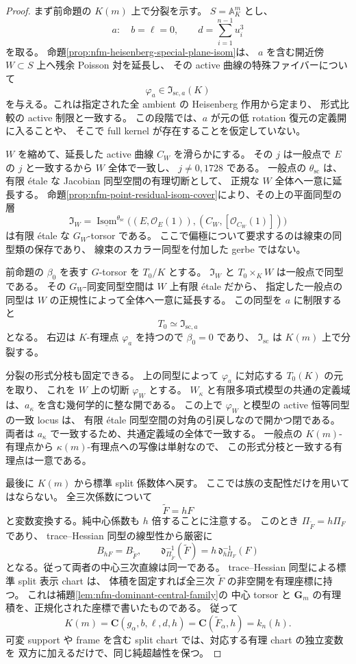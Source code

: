 \begin{proof}
まず前命題の $K(m)$ 上で分裂を示す。
$S=\mathbb A_K^m$ とし、
\[
 a:\quad b=\ell=0,\qquad d=\sum_{i=1}^{n-1}u_i^3
\]
を取る。
命題\ref{prop:nfm-heisenberg-special-plane-isom}は、
$a$ を含む開近傍 $W\subset S$ 上へ残余 Poisson 対を延長し、
その active 曲線の特殊ファイバーについて
\[
 \varphi_a\in\mathfrak I_{\mathrm{sc},a}(K)
\]
を与える。これは指定された全 ambient の Heisenberg 作用から定まり、
形式比較の active 制限と一致する。
この段階では、$a$ が元の低 rotation 復元の定義開に入ることや、
そこで full kernel が存在することを仮定していない。

$W$ を縮めて、延長した active 曲線 $C_W$ を滑らかにする。
その $j$ は一般点で $E$ の $j$ と一致するから $W$ 全体で一致し、
$j\ne0,1728$ である。
一般点の $\theta_{\mathrm{sc}}$ は、有限 \'etale な Jacobian 同型空間の有理切断として、
正規な $W$ 全体へ一意に延長する。
命題\ref{prop:nfm-point-residual-isom-cover}により、その上の平面同型の層
\[
 \mathfrak I_W
 =\underline{\operatorname{Isom}}^{\theta_{\mathrm{sc}}}
    \bigl((E,\mathcal O_E(1)),(C_W,[\mathcal O_{C_W}(1)])\bigr)
\]
は有限 \'etale な $G_W$-torsor である。
ここで偏極について要求するのは線束の同型類の保存であり、
線束のスカラー同型を付加した gerbe ではない。

前命題の $\beta_0$ を表す $G$-torsor を $T_0/K$ とする。
$\mathfrak I_W$ と $T_0\times_K W$ は一般点で同型である。
その $G_W$-同変同型空間は $W$ 上有限 \'etale だから、
指定した一般点の同型は $W$ の正規性によって全体へ一意に延長する。
この同型を $a$ に制限すると
\[
 T_0\simeq\mathfrak I_{\mathrm{sc},a}
\]
となる。
右辺は $K$-有理点 $\varphi_a$ を持つので $\beta_0=0$ であり、
$\mathfrak I_{\mathrm{sc}}$ は $K(m)$ 上で分裂する。

分裂の形式分枝も固定できる。
上の同型によって $\varphi_a$ に対応する $T_0(K)$ の元を取り、
これを $W$ 上の切断 $\varphi_W$ とする。
$W_\kappa$ と有限多項式模型の共通の定義域は、$a_\kappa$ を含む幾何学的に整な開である。
この上で $\varphi_W$ と模型の active 恒等同型の一致 locus は、
有限 \'etale 同型空間の対角の引戻しなので開かつ閉である。
両者は $a_\kappa$ で一致するため、共通定義域の全体で一致する。
一般点の $K(m)$-有理点から $\kappa(m)$-有理点への写像は単射なので、
この形式分枝と一致する有理点は一意である。

最後に $K(m)$ から標準 split 係数体へ戻す。
ここでは族の支配性だけを用いてはならない。
全三次係数について
\[
 \widetilde F=hF
\]
と変数変換する。純中心係数も $h$ 倍することに注意する。
このとき $\Pi_{\widetilde F}=h\Pi_F$ であり、
trace--Hessian 同型の線型性から厳密に
\[
 B_{hF}=B_{\widetilde F},\qquad
 \mathfrak d_{\Pi_{\widetilde F}}^{-1}(\widetilde F)
 =h\,\mathfrak d_{h\Pi_F}^{-1}(F)
\]
となる。従って両者の中心三次直線は同一である。
trace--Hessian 同型による標準 split 表示 chart は、
体積を固定すれば全三次 $\widetilde F$ の非空開を有理座標に持つ。
これは補題\ref{lem:nfm-dominant-central-family}の
中心 torsor と $\mathbf G_m$ の有理積を、正規化された座標で書いたものである。
従って
\[
 K(m)=\mathbf C(g_\alpha,b,\ell,d,h)
     =\mathbf C(\widetilde F_\alpha,h)
     =k_n(h).
\]
可変 support や frame を含む split chart では、対応する有理 chart の独立変数を
双方に加えるだけで、同じ純超越性を保つ。


\end{proof}
